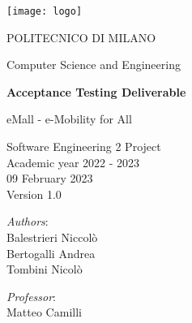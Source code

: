 \begin{titlingpage}
	\begin{center}
		\texttt{[image: logo]}
		
		\vspace{0.25cm}
		
		\LARGE POLITECNICO DI MILANO\\
		
		\vspace{0.2cm}
		
		\Large Computer Science and Engineering
		
		\vspace{0.8cm}
	
		\Huge \textbf{Acceptance Testing Deliverable}
		
		\vspace{0.5cm}
		\huge eMall - e-Mobility for All
		
		\vspace{1.5cm}
		\LARGE Software Engineering 2 Project\\
		\Large Academic year 2022 - 2023\\
		\vspace{1cm}
		09 February 2023\\Version 1.0
		\vspace{2.5cm}
		
		\large
		\begin{minipage}{.1\textwidth}
			\null
		\end{minipage}%
		\begin{minipage}{.4\textwidth}
			\textit{Authors}:\\
			Balestrieri Niccolò\\
			Bertogalli Andrea\\
			Tombini Nicolò
		\end{minipage}%
		\begin{minipage}{.4\textwidth}
			\raggedleft	
			\textit{Professor}:\\
			Matteo Camilli\\
			\phantom{placeholder}
		\end{minipage}%
		\begin{minipage}{.1\textwidth}
			\null
		\end{minipage}
	
			
		\end{center}
\end{titlingpage}